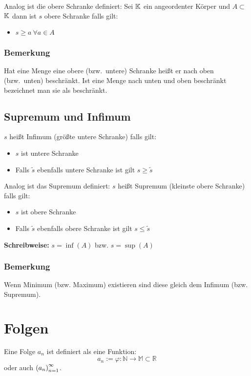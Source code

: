  Analog ist die obere Schranke definiert:
Sei $\mathbb{K}$ ein angeordenter Körper und $A \subset$ $\mathbb{K}$ dann ist $s$ obere
Schranke falls gilt:
\begin{itemize}
    \item $s \geq a\ \forall a \in A$
\end{itemize}

\subsubsection{Bemerkung} Hat eine Menge eine obere (bzw.\ untere) Schranke
heißt er nach oben (bzw.\ unten) beschränkt. Ist eine Menge nach unten und
oben beschränkt bezeichnet man sie als beschränkt.

\subsection{Supremum und Infimum}
$s$ heißt Infimum (größte untere Schranke) falls gilt:
\begin{itemize}
    \item $s$ ist untere Schranke
    \item Falls $\tilde{s}$ ebenfalls untere Schranke ist gilt
    $s\geq\tilde{s}$
\end{itemize}

 Analog ist das Supremum definiert: $s$ heißt Supremum (kleinste obere Schranke) falls gilt:
\begin{itemize}
    \item $s$ ist obere Schranke
    \item Falls $\tilde{s}$ ebenfalls obere Schranke ist gilt
    $s\leq\tilde{s}$
\end{itemize}

\textbf{Schreibweise:}
$s = \inf{(A)}$ bzw. $s = \sup{(A)}$

\subsubsection{Bemerkung}
Wenn Minimum (bzw. Maximum) existieren sind diese gleich dem
Infimum (bzw. Supremum).

\section{Folgen}
Eine Folge $a_n$ ist definiert als eine Funktion:
\begin{equation*}
    a_n := \varphi: \mathbb{N} \rightarrow \mathbb{M} \subset \mathbb{R}
\end{equation*}
oder auch ${(a_n)}_{n=1}^\infty$.

